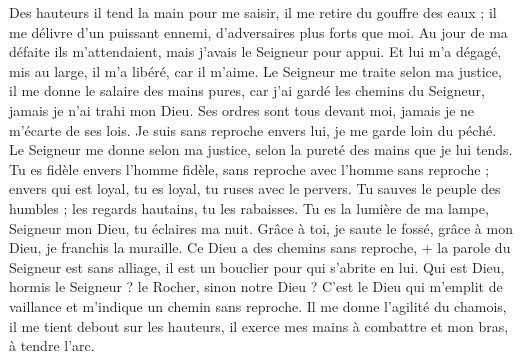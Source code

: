 Des hauteurs il tend la main pour me saisir, il me retire du gouffre des eaux ;
\versseparator
il me délivre d'un puissant ennemi, d'adversaires plus forts que moi.
\versseparator
Au jour de ma défaite ils m'attendaient, mais j'avais le Seigneur pour appui.
\versseparator
Et lui m'a dégagé, mis au large, il m'a libéré, car il m'aime.
\versseparator
Le Seigneur me traite selon ma justice, il me donne le salaire des mains pures,
\versseparator
car j'ai gardé les chemins du Seigneur, jamais je n'ai trahi mon Dieu.
\versseparator
Ses ordres sont tous devant moi, jamais je ne m'écarte de ses lois.
\versseparator
Je suis sans reproche envers lui, je me garde loin du péché.
\versseparator
Le Seigneur me donne selon ma justice, selon la pureté des mains que je lui tends.
\versseparator
Tu es fidèle envers l'homme fidèle, sans reproche avec l'homme sans reproche ;
\versseparator
envers qui est loyal, tu es loyal, tu ruses avec le pervers.
\versseparator
Tu sauves le peuple des humbles ; les regards hautains, tu les rabaisses.
\versseparator
Tu es la lumière de ma lampe, Seigneur mon Dieu, tu éclaires ma nuit.
\versseparator
Grâce à toi, je saute le fossé, grâce à mon Dieu, je franchis la muraille.
\versseparator
Ce Dieu a des chemins sans reproche, + la parole du Seigneur est sans alliage, il est un bouclier pour qui s'abrite en lui.
\versseparator
Qui est Dieu, hormis le Seigneur ? le Rocher, sinon notre Dieu ?
\versseparator
C'est le Dieu qui m'emplit de vaillance et m'indique un chemin sans reproche.
\versseparator
Il me donne l'agilité du chamois, il me tient debout sur les hauteurs,
\versseparator
il exerce mes mains à combattre et mon bras, à tendre l'arc.
